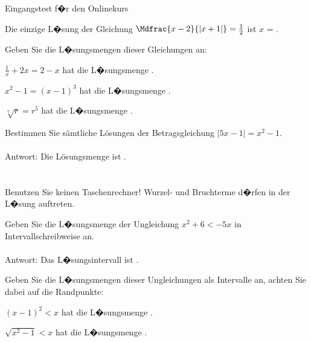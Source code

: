 \begin{MTest}{Eingangstest f�r den Onlinekurs}
\begin{MExercise}
Die einzige L�sung der Gleichung $\Mdfrac{x-2}{|x+1|}=\frac12$ ist $x$ = . %
\end{MExercise}

 
\begin{MExercise}
Geben Sie die L�sungsmengen dieser Gleichungen an:
\begin{MExerciseItems}
\item{$\frac1x+2x=2-x$ hat die L�sungsmenge .}
\item{$x^2-1=(x-1)^3$ hat die L�sungsmenge .}
\item{$\sqrt[7]{r}=r^5$ hat die L�sungsmenge .}
\end{MExerciseItems}
\end{MExercise}
 
\begin{MExercise}
Bestimmen Sie s\"amtliche L\"osungen der Betragsgleichung $|5x-1|=x^2-1$.
\ \\ \ \\
Antwort: Die L\"osungsmenge ist .\\
\ \\ \ \\
Benutzen Sie keinen Taschenrechner! Wurzel- und Bruchterme d�rfen in der L�sung auftreten.
\end{MExercise}

\begin{MExercise}
Geben Sie die L�sungsmenge der Ungleichung $x^2+6< -5x$ in Intervallschreibweise an.\\ \ \\
Antwort: Das L�sungsintervall ist .
\end{MExercise}


\begin{MExercise}
Geben Sie die L�sungsmengen dieser Ungleichungen als Intervalle an, achten Sie dabei auf die Randpunkte:
\begin{MExerciseItems}
\item{$(x-1)^2<x$ hat die L�sungsmenge .}
\item{$\sqrt{x^2-1}<x$ hat die L�sungsmenge \MLIntervalQuestion{40}{[1,infty)}{3}{FINA2}.}
\end{MExerciseItems}
\end{MExercise}


\end{MTest}
